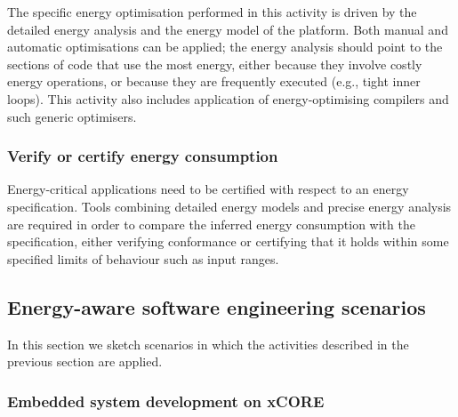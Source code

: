 \documentclass[oneside]{book}
\begin{document}
The specific energy optimisation performed in this activity 
is driven by the detailed energy analysis
and the energy model of the platform.  Both manual and automatic
optimisations can be applied; the energy analysis should point to the sections of
code that use the most energy, either because they involve costly energy operations,
or because they are frequently executed (e.g., tight inner loops).
This activity also includes application of energy-optimising compilers and such
generic optimisers.

\subsubsection{Verify or certify energy consumption}\label{certify}

Energy-critical applications need to be certified with respect to an
energy specification. Tools combining detailed energy models and
precise energy analysis are required in order to compare the inferred
energy consumption with the specification, either verifying conformance or 
certifying that it holds within some specified limits of behaviour such
as input ranges.


\subsection{Energy-aware software engineering scenarios}\label{sweng-scenarios}


In this section we sketch scenarios in which the activities described
in the previous section are applied.

\subsubsection{Embedded system development on xCORE}\label{xcore-scenario}
\end{document}
